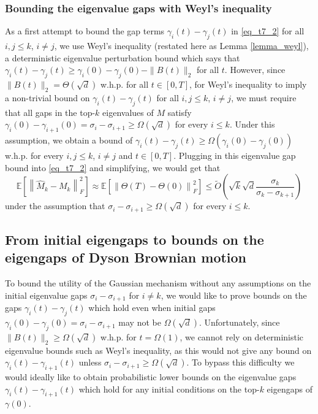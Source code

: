 \documentclass[11pt,letterpaper]{article}
\begin{document}
\subsubsection{Bounding the eigenvalue gaps with Weyl's inequality}

As a first attempt to bound the gap terms $\gamma_i(t) - \gamma_j(t)$ in \eqref{eq_t7_2} for all $i,j \leq k$, $i \neq j$, we use Weyl's inequality (restated here as Lemma \ref{lemma_weyl}), a deterministic eigenvalue perturbation bound which says that $\gamma_i(t) - \gamma_j(t) \geq \gamma_i(0) - \gamma_j(0) - \|B(t)\|_2$ for all $t$.
However, since $\|B(t)\|_2 = \Theta(\sqrt{d})$ w.h.p. for all $t\in [0,T]$, for Weyl's inequality to imply a non-trivial bound on $\gamma_i(t) - \gamma_j(t)$ for all $i,j \leq k$, $i \neq j$, we must require that all gaps in the top-$k$  eigenvalues of $M$ satisfy  $\gamma_i(0) - \gamma_{i+1}(0) = \sigma_i - \sigma_{i+1} \geq \Omega(\sqrt{d})$ for every $i\leq k$.
 Under this assumption, we obtain a bound of  $\gamma_i(t) - \gamma_j(t) \geq \Omega(\gamma_i(0) - \gamma_j(0))$ w.h.p. for every $i,j \leq k$, $i \neq j$ and $t\in [0,T]$.
 Plugging in this eigenvalue gap bound into \eqref{eq_t7_2} and simplifying, we would get that $$ \mathbb{E}\left[\left\|\hat{M}_k - M_k\right \|_F^2 \right] \approx \mathbb{E}\left[\left\|\Theta(T) -  \Theta(0)\right \|_F^2 \right] \leq \tilde{O}\left(\sqrt{k}\sqrt{d} \frac{\sigma_k}{\sigma_k-\sigma_{k+1}}\right)$$ under the assumption that  $\sigma_i - \sigma_{i+1} \geq \Omega(\sqrt{d})$ for every $i\leq k$.


\subsection{From initial eigengaps to  bounds on the eigengaps of Dyson Brownian motion}

To bound the utility of the Gaussian mechanism 
without any assumptions on the initial eigenvalue gaps $\sigma_i - \sigma_{i+1}$ for $i\neq k$, we would like to prove bounds on the gaps $\gamma_i(t) - \gamma_j(t)$ which hold even when initial gaps $\gamma_i(0) - \gamma_j(0) = \sigma_i- \sigma_{i+1}$ may not be $\Omega(\sqrt{d})$.
%
Unfortunately, since $\|B(t)\|_2 \geq \Omega(\sqrt{d})$ w.h.p. for $t = \Omega(1)$, we cannot rely on deterministic eigenvalue bounds such as Weyl's inequality, as this would not give any bound on $\gamma_i(t) - \gamma_{i+1}(t)$ unless $\sigma_i- \sigma_{i+1} \geq \Omega(\sqrt{d})$. 
%
To bypass this difficulty we would ideally like to obtain probabilistic lower bounds on the eigenvalue gaps $\gamma_i(t)- \gamma_{i+1}(t)$ which hold for any initial conditions on the top-$k$ eigengaps of $\gamma(0)$.
%
\end{document}
